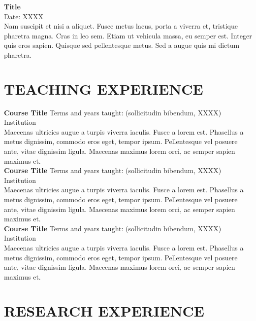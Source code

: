 \documentclass[a4paper,9pt]{extarticle}
\begin{document}
\noindent
\textbf{Title} \\
Date: XXXX \\
Nam suscipit et nisi a aliquet. Fusce metus lacus, porta a viverra et, tristique pharetra magna. Cras in leo sem. Etiam ut vehicula massa, eu semper est. Integer quis eros sapien. Quisque sed pellentesque metus. Sed a augue quis mi dictum pharetra. 


\section*{TEACHING EXPERIENCE}

\noindent
\newline
\textbf{Course Title} \hfill Terms and years taught: (sollicitudin bibendum, XXXX)\\
Institution\\
Maecenas ultricies augue a turpis viverra iaculis. Fusce a lorem est. Phasellus a metus dignissim, commodo eros eget, tempor ipsum. Pellentesque vel posuere ante, vitae dignissim ligula. Maecenas maximus lorem orci, ac semper sapien maximus et. \\ 

\noindent
\textbf{Course Title} \hfill Terms and years taught: (sollicitudin bibendum, XXXX)\\
Institution\\
Maecenas ultricies augue a turpis viverra iaculis. Fusce a lorem est. Phasellus a metus dignissim, commodo eros eget, tempor ipsum. Pellentesque vel posuere ante, vitae dignissim ligula. Maecenas maximus lorem orci, ac semper sapien maximus et. \\

\noindent
\textbf{Course Title} \hfill Terms and years taught: (sollicitudin bibendum, XXXX)\\
Institution\\
Maecenas ultricies augue a turpis viverra iaculis. Fusce a lorem est. Phasellus a metus dignissim, commodo eros eget, tempor ipsum. Pellentesque vel posuere ante, vitae dignissim ligula. Maecenas maximus lorem orci, ac semper sapien maximus et. 


\section*{RESEARCH EXPERIENCE}
\end{document}
